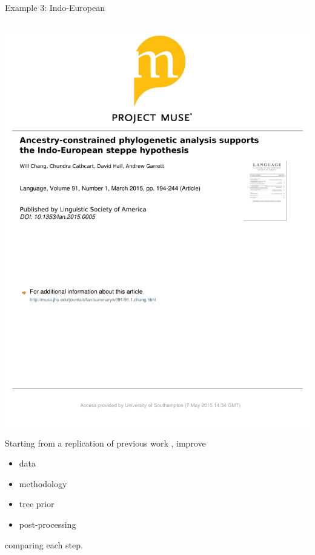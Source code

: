 \documentclass[9pt]{beamer}
\begin{document}
\begin{frame}{Example 3: Indo-European}
\begin{columns}
\begin{column}{0.5\textwidth}
      \includegraphics[width=\textwidth,page=31,trim={3.5cm 19.8cm 2.5cm 2.8cm},clip]{chang2015ancestry.pdf}

      Starting from a replication of previous work \parencite{bouckaert2012mapping}, improve
      \begin{itemize}
        \item data
        \item methodology
        \item tree prior
        \item post-processing
      \end{itemize}
      comparing each step.
    \end{column}
  \end{columns}
\end{frame}
\end{document}
